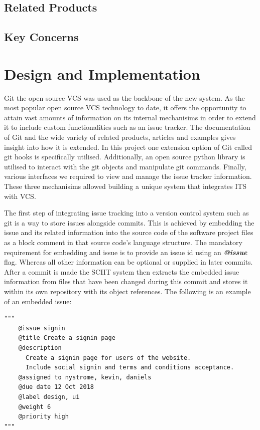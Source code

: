 \documentclass{mproj}
\newenvironment{code}{\captionsetup{type=listing}}{}
\begin{document}
\section{Related Products}

\section{Key Concerns}
\chapter{Design and Implementation}\label{design}


Git the open source VCS was used as the backbone of the new system. As the most popular open source VCS  technology to date, it offers the opportunity to attain vast amounts of information on its internal mechanisims in order to extend it to include custom functionalities such as an issue tracker. The documentation of Git and the wide variety of related products, articles and examples gives insight into how it is extended. In this project one extension option of Git called git hooks is specifically utilised. Additionally, an open source python library is utilised to interact with the git objects and manipulate git commands. Finally, various interfaces we required to view and manage the issue tracker information. These three mechanisims allowed building a unique system that integrates ITS with VCS.


The first step of integrating issue tracking into a version control system such as git is a way to store issues alongside commits. This is achieved by embedding the issue and its related information into the source code of the software project files as a block comment in that source code's language structure. The mandatory requirement for embedding and issue is to provide an issue id using an \textbf{\textit{@issue}} flag. Whereas all other information can be optional or supplied in later commits. After a commit is made the SCIIT system then extracts the embedded issue information from files that have been changed during this commit and stores it within its own repository with its object references. The following is an example of an embedded issue:

\begin{code}
\begin{verbatim}
"""
    @issue signin
    @title Create a signin page
    @description
      Create a signin page for users of the website. 
      Include social signin and terms and conditions acceptance.
    @assigned to nystrome, kevin, daniels
    @due date 12 Oct 2018
    @label design, ui
    @weight 6
    @priority high    
"""
\end{verbatim}
\end{code}
\end{document}
